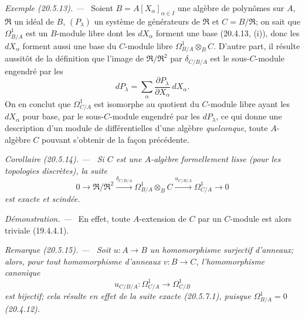\documentclass[10pt,oneside]{book}
\makeatletter
\newcommand{\setmanualcurrentlabel}[1]{\def\@currentlabel{#1}}
\newcommand{\oldpage}[2][]{%
  \setcounter{footnote}{0}%
  \marginpar{\scriptsize\textbf{#1}~|~#2}\ignorespaces}
\newenvironment{corollary}[1][]{%
  \setmanualcurrentlabel{#1}\par\medskip\noindent\itshape Corollaire (#1). ---\ }{\par}
\newenvironment{remark}[1][]{%
  \setmanualcurrentlabel{#1}\par\medskip\noindent\itshape Remarque (#1). ---\ }{\par}
\newenvironment{example}[1][]{%
  \setmanualcurrentlabel{#1}\par\medskip\noindent\textit{Exemple (#1). ---}\ }{\par}
\newenvironment{proof}{%
  \par\medskip\noindent\textit{Démonstration. ---\ }}{\par}
\makeatother
\begin{document}
\begin{example}[20.5.13]
\label{0.20.5.13-fr}
Soient $B=A[X_\alpha]_{\alpha\in I}$ une algèbre de polynômes sur $A$,
$\mathfrak{R}$ un idéal de $B$, $(P_\lambda)$ un système de générateurs
de $\mathfrak{R}$ et $C=B/\mathfrak{R}$; on sait que
$\Omega^1_{B/A}$ est un $B$-module libre dont les $dX_\alpha$ forment une
base (20.4.13, (i)), donc les $dX_\alpha$ forment aussi une base du
$C$-module libre $\Omega^1_{B/A}\otimes_B C$. D'autre part, il résulte
aussitôt de la définition que l'image de
$\mathfrak{R}/\mathfrak{R}^2$ par $\delta_{C/B/A}$ est le sous-$C$-module
engendré par les
\[
  dP_\lambda=\sum_\alpha
  \frac{\partial P_\lambda}{\partial X_\alpha}\,dX_\alpha.
\]
On en conclut que $\Omega^1_{C/A}$ est isomorphe au quotient du
$C$-module libre ayant les $dX_\alpha$ pour base, par le sous-$C$-module
engendré par les $dP_\lambda$, ce qui donne une description d'un module
de différentielles d'une algèbre \emph{quelconque}, toute $A$-algèbre
$C$ pouvant s'obtenir de la façon précédente.
\end{example}

\begin{corollary}[20.5.14]
\label{0.20.5.14-fr}
Si $C$ est une $A$-algèbre formellement lisse (pour les topologies
discrètes), la suite
\begin{equation}
\tag{20.5.14.1}
\label{0.20.5.14.1-fr}
  0\longrightarrow\mathfrak{R}/\mathfrak{R}^2
  \xrightarrow{\delta_{C/B/A}}\Omega^1_{B/A}\otimes_B C
  \xrightarrow{u_{C/B/A}}\Omega^1_{C/A}\longrightarrow0
\end{equation}
est exacte et scindée.
\end{corollary}

\begin{proof}
En effet, toute $A$-extension de $C$ par un $C$-module est alors triviale
(19.4.4.1).
\end{proof}

\oldpage[0\textsubscript{IV-1}]{136}
\begin{remark}[20.5.15]
\label{0.20.5.15-fr}
Soit $u:A\to B$ un homomorphisme \emph{surjectif} d'anneaux; alors, pour
tout homomorphisme d'anneaux $v:B\to C$, l'homomorphisme canonique
\begin{equation}
\tag{20.5.15.1}
\label{0.20.5.15.1-fr}
  u_{C/B/A}:\Omega^1_{C/A}\longrightarrow\Omega^1_{C/B}
\end{equation}
est \emph{bijectif}; cela résulte en effet de la suite exacte (20.5.7.1),
puisque $\Omega^1_{B/A}=0$ (20.4.12).
\end{remark}
\end{document}
